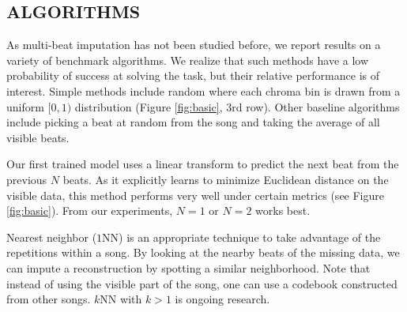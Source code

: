 \documentclass{article}
\begin{document}
\subsection{ALGORITHMS}
\label{ssec:algo}
As multi-beat imputation has not been studied before, we report
results on a variety of benchmark algorithms. We realize that such
methods have a low probability of success at solving the task, but
their relative performance is of interest.  Simple methods include
random where each chroma bin is drawn from a uniform $[0,1)$
distribution (Figure \ref{fig:basic}, $3$rd row).  Other baseline
algorithms include picking a beat at random from the song and taking
the average of all visible beats.

Our first trained model uses a linear transform to predict the next beat from the previous $N$ beats.
As it explicitly learns to minimize Euclidean distance on the visible
data, this method performs very well under certain metrics (see Figure
\ref{fig:basic}). From our experiments, $N=1$ or $N=2$ works best.

Nearest neighbor ($1$NN) is an appropriate technique to take advantage
of the repetitions within a song.  By looking at the nearby beats of
the missing data, we can impute a reconstruction by spotting a similar
neighborhood. Note that instead of using the visible part of the song,
one can use a codebook constructed from other songs.  $k$NN with $k>1$
is ongoing research.
\end{document}
